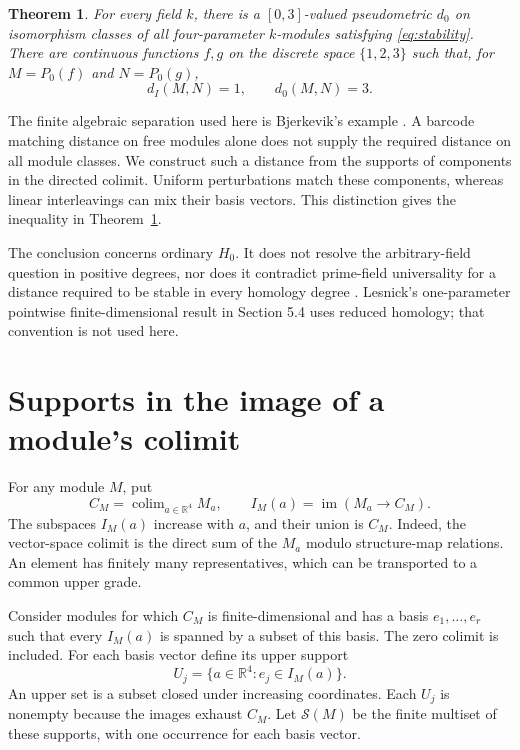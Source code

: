 \documentclass[11pt]{article}
\newtheorem{theorem}{Theorem}
\newcommand{\R}{\mathbb R}
\newcommand{\colim}{\mathop{\mathrm{colim}}}
\newcommand{\im}{\mathop{\mathrm{im}}}
\begin{document}
\begin{theorem}\label{thm:main}
For every field $k$, there is a $[0,3]$-valued pseudometric $d_0$ on
isomorphism classes of all four-parameter $k$-modules satisfying
\eqref{eq:stability}. There are continuous functions $f,g$ on the discrete
space $\{1,2,3\}$ such that, for $M=P_0(f)$ and $N=P_0(g)$,
\[
 d_I(M,N)=1,\qquad d_0(M,N)=3.
\]
\end{theorem}

The finite algebraic separation used here is Bjerkevik's example
\cite[Examples 5.2--5.3]{Bjerkevik}. A barcode matching distance on free modules
alone does not supply the required distance on all module classes. We construct
such a distance from the supports of components in the directed colimit.
Uniform perturbations match these components, whereas linear interleavings
can mix their basis vectors. This distinction gives the inequality in
Theorem~\ref{thm:main}.

The conclusion concerns ordinary $H_0$. It does not resolve the
arbitrary-field question in positive degrees, nor does it contradict
prime-field universality for a distance required to be stable in every
homology degree \cite[Corollary 5.6]{Lesnick}. Lesnick's one-parameter
pointwise finite-dimensional result in Section 5.4 uses reduced homology;
that convention is not used here.

\section{Supports in the image of a module's colimit}

For any module $M$, put
\[
 C_M=\colim_{a\in\R^4}M_a,\qquad
 I_M(a)=\im(M_a\longrightarrow C_M).
\]
The subspaces $I_M(a)$ increase with $a$, and their union is $C_M$.
Indeed, the vector-space colimit is the direct sum of the $M_a$ modulo
structure-map relations. An element has finitely many representatives, which
can be transported to a common upper grade.

Consider modules for which $C_M$ is finite-dimensional and has a basis
$e_1,\ldots,e_r$ such that every $I_M(a)$ is spanned by a subset of this
basis. The zero colimit is included. For each basis vector define its upper
support
\[
 U_j=\{a\in\R^4:e_j\in I_M(a)\}.
\]
An upper set is a subset closed under increasing coordinates. Each $U_j$
is nonempty because the images exhaust $C_M$. Let $\mathcal S(M)$ be the
finite multiset of these supports, with one occurrence for each basis vector.
\end{document}
